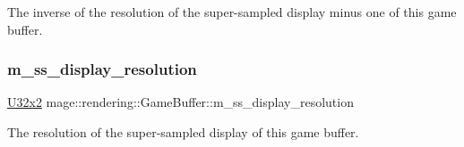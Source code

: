 The inverse of the resolution of the super-\/sampled display minus one of this game buffer. \hypertarget{structmage_1_1rendering_1_1_game_buffer_a76b01da64f8eb8f7ba431371a71d35a4}{}\label{structmage_1_1rendering_1_1_game_buffer_a76b01da64f8eb8f7ba431371a71d35a4} 
\subsubsection{\texorpdfstring{m\+\_\+ss\+\_\+display\+\_\+resolution}{m\_ss\_display\_resolution}}
{\footnotesize\ttfamily \hyperlink{namespacemage_a88e05bff0300120c013285d3dcad95c5}{U32x2} mage\+::rendering\+::\+Game\+Buffer\+::m\+\_\+ss\+\_\+display\+\_\+resolution}

The resolution of the super-\/sampled display of this game buffer. 